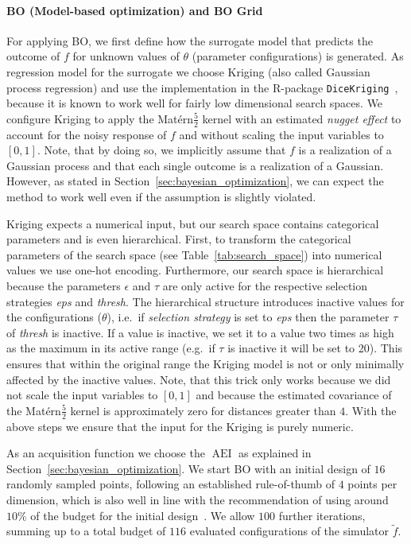 \documentclass[bimj,fleqn]{w-art}
\theoremstyle{plain}
\theoremstyle{definition}
\begin{document}
\paragraph{BO (Model-based optimization) and BO Grid}
For applying BO, we first define how the surrogate model that predicts the outcome of $f$ for unknown values of $\theta$ (parameter configurations) is generated.
As regression model for the surrogate we choose Kriging (also called Gaussian process regression) and use the implementation in the R-package \texttt{DiceKriging}~\citep{roustant_dicekriging_2012}, because it is known to work well for fairly low dimensional search spaces.
We configure Kriging to apply the Matérn$\frac{5}{2}$ kernel with an estimated \emph{nugget effect} to account for the noisy response of $f$ and without scaling the input variables to $[0,1]$.
Note, that by doing so, we implicitly assume that $f$ is a realization of a Gaussian process and that each single outcome is a realization of a Gaussian.
However, as stated in Section~\ref{sec:bayesian_optimization}, we can expect the method to work well even if the assumption is slightly violated.


Kriging expects a numerical input, but our search space contains categorical parameters and is even hierarchical.
First, to transform the categorical parameters of the search space (see Table~\ref{tab:search_space}) into numerical values we use one-hot encoding.
Furthermore, our search space is hierarchical because the parameters $\epsilon$ and $\tau$ are only active for the respective selection strategies \emph{eps} and \emph{thresh}.
The hierarchical structure introduces inactive values for the configurations ($\theta$), i.e.\ if \emph{selection strategy} is set to \emph{eps} then the parameter $\tau$ of \emph{thresh} is inactive.
If a value is inactive, we set it to a value two times as high as the maximum in its active range (e.g.\ if $\tau$ is inactive it will be set to 20).
This ensures that within the original range the Kriging model is not or only minimally affected by the inactive values.
Note, that this trick only works because we did not scale the input variables to $[0,1]$ and because the estimated covariance of the Matérn$\frac{5}{2}$ kernel is approximately zero for distances greater than $4$.
With the above steps we ensure that the input for the Kriging is purely numeric.

As an acquisition function we choose the $\operatorname{AEI}$ as explained in Section~\ref{sec:bayesian_optimization}.
We start BO with an initial design of $16$ randomly sampled points, following an established rule-of-thumb of $4$ points per dimension, which is also well in line with the recommendation of using around $10\%$ of the budget for the initial design~\cite{bossek_initial_2020}.
We allow $100$ further iterations, summing up to a total budget of $116$ evaluated configurations of the simulator $\tilde{f}$.
\end{document}
